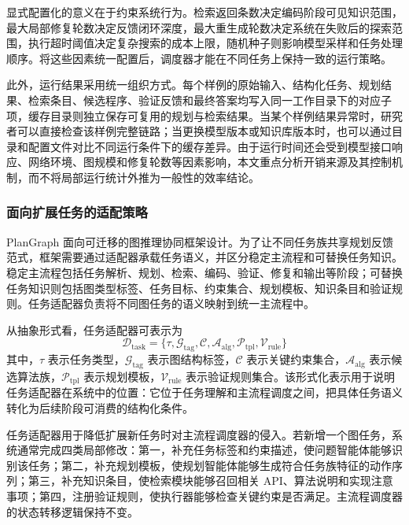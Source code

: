 显式配置化的意义在于约束系统行为。检索返回条数决定编码阶段可见知识范围，最大局部修复轮数决定反馈闭环深度，最大重生成轮数决定系统在失败后的探索范围，执行超时阈值决定复杂搜索的成本上限，随机种子则影响模型采样和任务处理顺序。将这些因素统一配置后，调度器才能在不同任务上保持一致的运行策略。

此外，运行结果采用统一组织方式。每个样例的原始输入、结构化任务、规划结果、检索条目、候选程序、验证反馈和最终答案均写入同一工作目录下的对应子项，缓存目录则独立保存可复用的规划与检索结果。当某个样例结果异常时，研究者可以直接检查该样例完整链路；当更换模型版本或知识库版本时，也可以通过目录和配置文件对比不同运行条件下的缓存差异。由于运行时间还会受到模型接口响应、网络环境、图规模和修复轮数等因素影响，本文重点分析开销来源及其控制机制，而不将局部运行统计外推为一般性的效率结论。

\subsubsection{面向扩展任务的适配策略}

PlanGraph 面向可迁移的图推理协同框架设计。为了让不同任务族共享规划反馈范式，框架需要通过适配器承载任务语义，并区分稳定主流程和可替换任务知识。稳定主流程包括任务解析、规划、检索、编码、验证、修复和输出等阶段；可替换任务知识则包括图类型标签、任务目标、约束集合、规划模板、知识条目和验证规则。任务适配器负责将不同图任务的语义映射到统一主流程中。

从抽象形式看，任务适配器可表示为
\begin{equation}
\mathcal{D}_{\mathrm{task}}=\{\tau,\mathcal{G}_{\mathrm{tag}},\mathcal{C},\mathcal{A}_{\mathrm{alg}},\mathcal{P}_{\mathrm{tpl}},\mathcal{V}_{\mathrm{rule}}\}
\end{equation}
其中，$\tau$ 表示任务类型，$\mathcal{G}_{\mathrm{tag}}$ 表示图结构标签，$\mathcal{C}$ 表示关键约束集合，$\mathcal{A}_{\mathrm{alg}}$ 表示候选算法族，$\mathcal{P}_{\mathrm{tpl}}$ 表示规划模板，$\mathcal{V}_{\mathrm{rule}}$ 表示验证规则集合。该形式化表示用于说明任务适配器在系统中的位置：它位于任务理解和主流程调度之间，把具体任务语义转化为后续阶段可消费的结构化条件。

任务适配器用于降低扩展新任务时对主流程调度器的侵入。若新增一个图任务，系统通常完成四类局部修改：第一，补充任务标签和约束描述，使问题智能体能够识别该任务；第二，补充规划模板，使规划智能体能够生成符合任务族特征的动作序列；第三，补充知识条目，使检索模块能够召回相关 API、算法说明和实现注意事项；第四，注册验证规则，使执行器能够检查关键约束是否满足。主流程调度器的状态转移逻辑保持不变。

